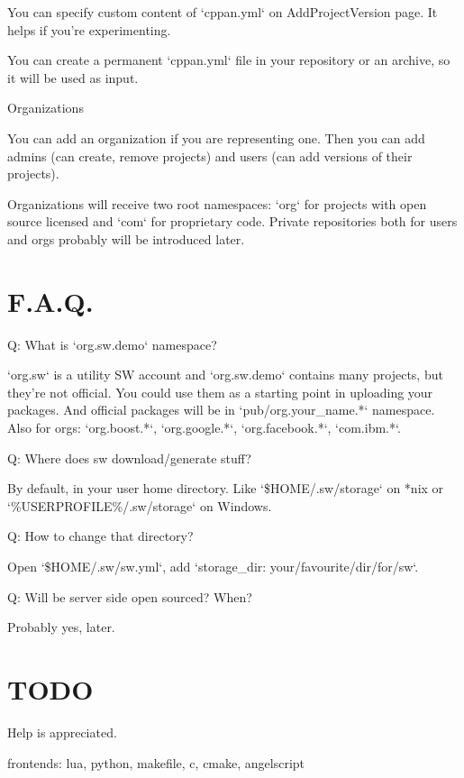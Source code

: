 You can specify custom content of `cppan.yml` on AddProjectVersion page. It helps if you're experimenting.

You can create a permanent `cppan.yml` file in your repository or an archive, so it will be used as input.

Organizations

You can add an organization if you are representing one. Then you can add admins (can create, remove projects) and users (can  add versions of their projects).

Organizations will receive two root namespaces: `org` for projects with open source licensed and `com` for proprietary code. Private repositories both for users and orgs probably will be introduced later.










\chapter*{F.A.Q.}


Q: What is `org.sw.demo` namespace?

`org.sw` is a utility SW account and `org.sw.demo` contains many projects, but they're not official. You could use them as a starting point in uploading your packages. And official packages will be in `pub/org.your_name.*` namespace. Also for orgs: `org.boost.*`, `org.google.*`, `org.facebook.*`, `com.ibm.*`.

Q: Where does sw download/generate stuff?

By default, in your user home directory. Like `\$HOME/.sw/storage` on *nix or `\%USERPROFILE\%/.sw/storage` on Windows.

Q: How to change that directory?

Open `\$HOME/.sw/sw.yml`, add `storage_dir: your/favourite/dir/for/sw`.

Q: Will be server side open sourced? When?

Probably yes, later.



\chapter*{TODO}

Help is appreciated.

frontends: lua, python, makefile, c, cmake, angelscript
